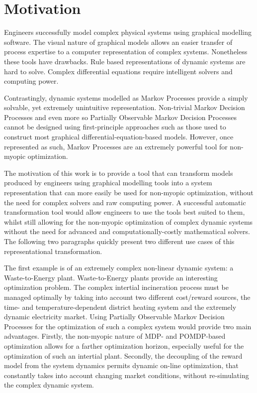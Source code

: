 \chapter{Motivation}
\label{motivation}

Engineers successfully model complex physical systems using graphical modelling software. The visual nature of graphical models allows an easier transfer of process expertise to a computer representation of complex systems. Nonetheless these tools have drawbacks. Rule based representations of dynamic systems are hard to solve. Complex differential equations require intelligent solvers and computing power.

Contrastingly, dynamic systems modelled as Markov Processes provide a simply solvable, yet extremely unintuitive representation. Non-trivial Markov Decision Processes and even more so Partially Observable Markov Decision Processes cannot be designed using first-principle approaches such as those used to construct most graphical differential-equation-based models. However, once represented as such, Markov Processes are an extremely powerful tool for non-myopic optimization.

The motivation of this work is to provide a tool that can transform models produced by engineers using graphical modelling tools into a system representation that can more easily be used for non-myopic optimization, without the need for complex solvers and raw computing power. A successful automatic transformation tool would allow engineers to use the tools best suited to them, whilst still allowing for the non-myopic optimization of complex dynamic systems without the need for advanced and computationally-costly mathematical solvers. The following two paragraphs quickly present two different use cases of this representational transformation.

The first example is of an extremely complex non-linear dynamic system: a Waste-to-Energy plant. Waste-to-Energy plants provide an interesting optimization problem. The complex intertial incineration process must be managed optimally by taking into account two different cost/reward sources, the time- and temperature-dependent district heating system and the extremely dynamic electricity market. Using Partially Observable Markov Decision Processes for the optimization of such a complex system would provide two main advantages. Firstly, the non-myopic nature of MDP- and POMDP-based optimization allows for a farther optimization horizon, especially useful for the optimization of such an intertial plant. Secondly, the decoupling of the reward model from the system dynamics permits dynamic on-line optimization, that constantly takes into account changing market conditions, without re-simulating the complex dynamic system.

